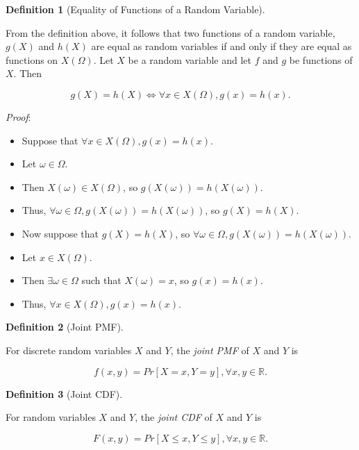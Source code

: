 \documentclass[
]{article}
\theoremstyle{definition}
\newtheorem{definition}{Definition}[section]
\theoremstyle{definition}
\theoremstyle{definition}
\theoremstyle{remark}
\begin{document}
\begin{definition}[Equality of Functions of a Random Variable]
\protect\hypertarget{def:unlabeled-div-39}{}\label{def:unlabeled-div-39}

From the definition above, it follows that two functions of a random variable, \(g(X)\) and \(h(X)\) are equal as random variables if and only if they are equal as functions on \(X(\Omega)\). Let \(X\) be a random variable and let \(f\) and \(g\) be functions of \(X\). Then

\[g(X) = h(X) \iff \forall x \in X(\Omega), g(x) = h(x).\]

\emph{Proof}:

\begin{itemize}
\item
  Suppose that \(\forall x \in X(\Omega), g(x) = h(x)\).
\item
  Let \(\omega \in \Omega\).
\item
  Then \(X(\omega) \in X(\Omega)\), so \(g(X(\omega)) = h(X(\omega))\).
\item
  Thus, \(\forall \omega \in \Omega, g(X(\omega)) = h(X(\omega))\), so \(g(X) = h(X)\).
\item
  Now suppose that \(g(X) = h(X)\), so \(\forall \omega \in \Omega, g(X(\omega)) = h(X(\omega))\).
\item
  Let \(x \in X(\Omega)\).
\item
  Then \(\exists \omega \in \Omega\) such that \(X(\omega) = x\), so \(g(x) = h(x)\).
\item
  Thus, \(\forall x \in X(\Omega), g(x) = h(x).\)
\end{itemize}

\end{definition}

\begin{definition}[Joint PMF]
\protect\hypertarget{def:unlabeled-div-40}{}\label{def:unlabeled-div-40}

For discrete random variables \(X\) and \(Y\), the \emph{joint PMF} of \(X\) and \(Y\) is

\[f(x,y) = Pr[X=x, Y=y], \forall x,y \in \mathbb{R}.\]

\end{definition}

\begin{definition}[Joint CDF]
\protect\hypertarget{def:unlabeled-div-41}{}\label{def:unlabeled-div-41}

For random variables \(X\) and \(Y\), the \emph{joint CDF} of \(X\) and \(Y\) is

\[F(x,y) = Pr[X \leq x, Y \leq y], \forall x,y \in \mathbb{R}.\]

\end{definition}
\end{document}
